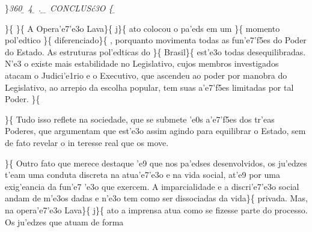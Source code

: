 \}\pard \ltrpar\qj {}\sl360\widctlpar\wrapdefault\aspalpha\aspnum\faauto\adjustright{} {\rtlch{} \ab{} \ltrch{} \b{} 4}{\rtlch{} \ab{} 
\ltrch{} \b{} .}{\rtlch{} \ab{} \ltrch{} \b{}  }{\rtlch{} \ab{} \ltrch{} \b{} CONCLUS\'c3O }\{\rtlch{}
\ab{} \ltrch{} \b{}
\par \}\{\rtlch{}  \ltrch{} 
\tab \}\{\rtlch{}  \ltrch{}  A
Opera'e7'e3o Lava\}\{\rtlch{}  \ltrch{} 
j\}\{\rtlch{}  \ltrch{}  ato
colocou o pa'eds em um \}\{\rtlch{}  \ltrch{} 
momento pol'edtico \}\{\rtlch{}  \ltrch{} 
diferenciado\}\{\rtlch{}  \ltrch{}
 , porquanto movimenta todas as
fun'e7'f5es do Poder do Estado. As estruturas pol'edticas do
\}\{\rtlch{}  \ltrch{}  Brasil\}\{\rtlch{}
 \ltrch{}  est'e3o todas
desequilibradas. N'e3 o existe mais estabilidade no Legislativo, cujos
membros investigados atacam o Judici'e1rio e o Executivo, que ascendeu
ao poder por manobra do Legislativo, ao arrepio da escolha popular, tem
suas a'e7'f5es limitadas por tal Poder. \}\{\rtlch{}  \ltrch{}
 \par \}\{\rtlch{}  \ltrch{}
 \tab Tudo isso reflete na sociedade, que
se submete 'e0s a'e7'f5es dos tr'eas Poderes, que argumentam que est'e3o
assim agindo para equilibrar o Estado, sem de fato revelar o in teresse
real que os move. \par \tab \}\{\rtlch{}  \ltrch{}
 Outro fato que merece destaque 'e9 que
nos pa'edses desenvolvidos, os ju'edzes t'eam uma conduta discreta na
atua'e7'e3o e na vida social, at'e9 por uma exig'eancia da fun'e7 'e3o
que exercem. A imparcialidade e a discri'e7'e3o social andam de m'e3os
dadas e n'e3o tem como ser dissociadas da vida\}\{\rtlch{} 
\ltrch{}  privada. Mas, na opera'e7'e3o
Lava\}\{\rtlch{}  \ltrch{}  j\}\{\rtlch{}
 \ltrch{}  ato a imprensa atua
como se fizesse parte do processo. Os ju'edzes que atuam de forma
